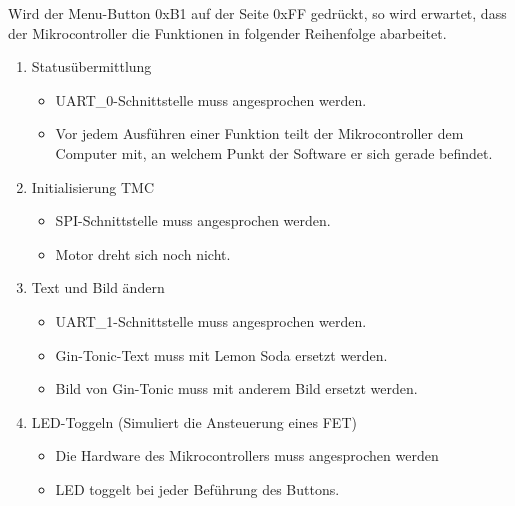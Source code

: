Wird der Menu-Button 0xB1 auf der Seite 0xFF gedrückt, so wird erwartet, dass der Mikrocontroller die Funktionen in folgender Reihenfolge abarbeitet. 
\begin{enumerate}
\item Statusübermittlung
\begin{itemize}
\item UART\_0-Schnittstelle muss angesprochen werden.
\item Vor jedem Ausführen einer Funktion teilt der Mikrocontroller dem Computer mit, an welchem Punkt der Software er sich gerade befindet.
\end{itemize}
\item Initialisierung TMC
\begin{itemize}
\item SPI-Schnittstelle muss angesprochen werden.
\item Motor dreht sich noch nicht.
\end{itemize}
\item Text und Bild ändern
\begin{itemize}
\item UART\_1-Schnittstelle muss angesprochen werden.
\item Gin-Tonic-Text muss mit Lemon Soda ersetzt werden.
\item Bild von Gin-Tonic muss mit anderem Bild ersetzt werden.
\end{itemize}
\item LED-Toggeln (Simuliert die Ansteuerung eines FET)
\begin{itemize}
\item Die Hardware des Mikrocontrollers muss angesprochen werden
\item LED toggelt bei jeder Beführung des Buttons.
\end{itemize}

\end{enumerate}



